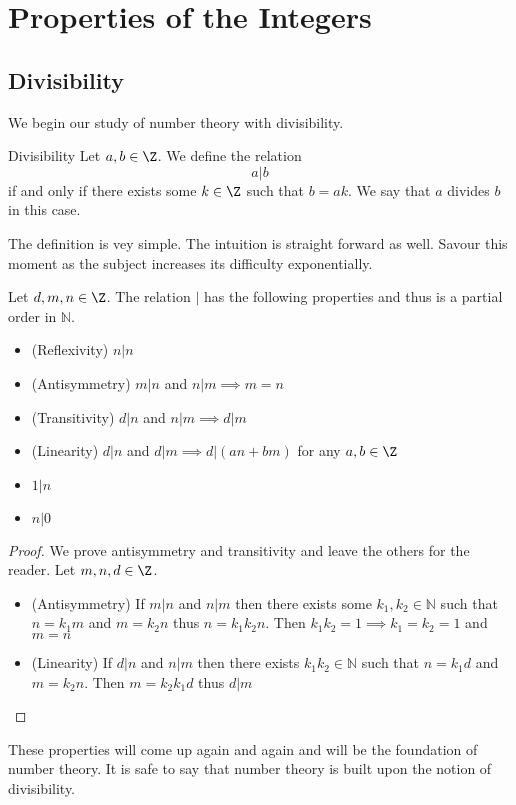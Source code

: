 \section{Properties of the Integers}
\subsection{Divisibility}
We begin our study of number theory with divisibility. 
\begin{defn}{Divisibility}{} Let $a,b\in\Z$. We define the relation $$a|b$$ if and only if there exists some $k\in\Z$ such that $b=ak$. We say that $a$ divides $b$ in this case. 
\end{defn}
The definition is vey simple. The intuition is straight forward as well. Savour this moment as the subject increases its difficulty exponentially.  

\begin{prp}{}{} Let $d,m,n\in\Z$. The relation $|$ has the following properties and thus is a partial order in $\mathbb{N}$. 
\begin{itemize}
\item (Reflexivity) $n|n$
\item (Antisymmetry) $m|n$ and $n|m\implies m=n$
\item (Transitivity) $d|n$ and $n|m\implies d|m$
\item (Linearity) $d|n$ and $d|m\implies d|(an+bm)$ for any $a,b\in\Z$
\item $1|n$
\item $n|0$
\end{itemize}\tcbline
\begin{proof} We prove antisymmetry and transitivity and leave the others for the reader. Let $m,n,d\in\Z$. 
\begin{itemize}
\item (Antisymmetry) If $m|n$ and $n|m$ then there exists some $k_1,k_2\in\mathbb{N}$ such that $n=k_1m$ and $m=k_2n$ thus $n=k_1k_2n$. Then $k_1k_2=1\implies k_1=k_2=1$ and $m=n$
\item (Linearity) If $d|n$ and $n|m$ then there exists $k_1k_2\in\mathbb{N}$ such that $n=k_1d$ and $m=k_2n$. Then $m=k_2k_1d$ thus $d|m$
\end{itemize}
\end{proof}
\end{prp}


These properties will come up again and again and will be the foundation of number theory. It is safe to say that number theory is built upon the notion of divisibility. 

